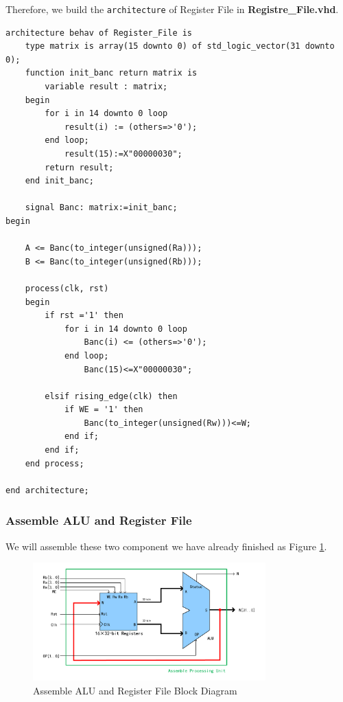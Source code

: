 Therefore, we build the \texttt{architecture} of Register File in \textbf{Registre\_File.vhd}.

\begin{lstlisting}[style=vhdl]
architecture behav of Register_File is
	type matrix is array(15 downto 0) of std_logic_vector(31 downto 0);
	function init_banc return matrix is
		variable result : matrix;
	begin
		for i in 14 downto 0 loop
			result(i) := (others=>'0');
		end loop;
			result(15):=X"00000030";
		return result;
	end init_banc;

	signal Banc: matrix:=init_banc;
begin
	
	A <= Banc(to_integer(unsigned(Ra))); 
	B <= Banc(to_integer(unsigned(Rb))); 

	process(clk, rst) 
	begin 
        if rst ='1' then 
            for i in 14 downto 0 loop
                Banc(i) <= (others=>'0');
            end loop;
                Banc(15)<=X"00000030";
            
        elsif rising_edge(clk) then 
            if WE = '1' then 
                Banc(to_integer(unsigned(Rw)))<=W; 
            end if; 
        end if; 
	end process; 

end architecture;
\end{lstlisting}

\subsubsection{Assemble ALU and Register File}
\label{sec:Assemble ALU and Register File}

We will assemble these two component we have already finished as Figure \ref{fig:AsmbALURF}.

\begin{figure}[htp]
    \centering
    \includegraphics[width = 0.8\textwidth]{picture/AsmbALURF.pdf}
    \caption{Assemble ALU and Register File Block Diagram}     
    \label{fig:AsmbALURF}
\end{figure}

